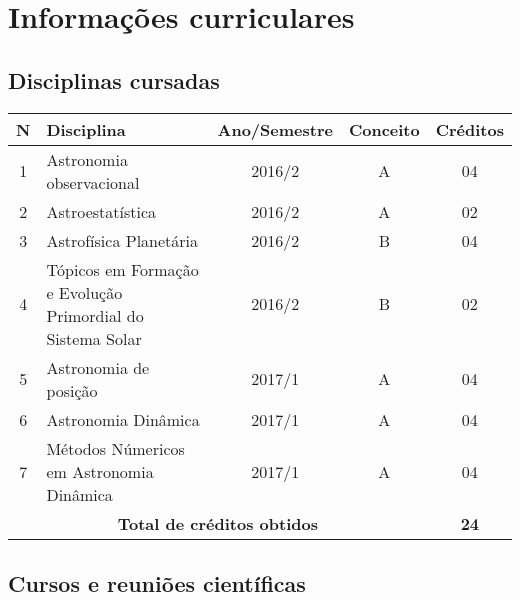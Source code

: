 \documentclass[a4paper, 11pt]{article}
\begin{document}
\section{Informa\c{c}\~oes curriculares}

\subsection{Disciplinas cursadas}

\begin{center}
\begin{tabular}{clccc}
\toprule
\textbf{N}&$\hspace{2cm}$\textbf{Disciplina} &\textbf{Ano/Semestre}&\textbf{Conceito}& \textbf{Cr\'editos} \\ \midrule
1 & Astronomia observacional                                             & 2016/2 & A & 04 \\ 
2 & Astroestatística                                                     & 2016/2 & A & 02 \\ 
3 & Astrofísica Planetária                                               & 2016/2 & B & 04 \\ 
4 & Tópicos em Formação e Evolução Primordial do Sistema Solar           & 2016/2 & B & 02 \\
5 & Astronomia de posição                                                & 2017/1 & A & 04 \\ 
6 & Astronomia Dinâmica                                                  & 2017/1 & A & 04 \\ 
7 & Métodos Númericos em Astronomia Dinâmica                             & 2017/1 & A & 04 \\ \midrule 
\multicolumn{4}{c}{\textbf{Total de cr\'editos obtidos}}               & \textbf{24} \\ \bottomrule
\end{tabular}
\end{center}

\subsection{Cursos e reuni\~oes cient\'ificas}
\end{document}
